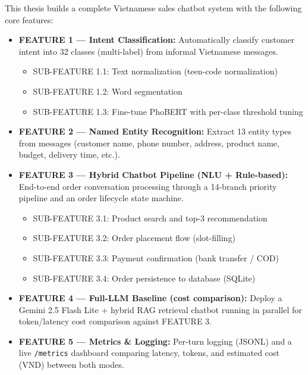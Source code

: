 \documentclass[12pt, a4paper]{report}
\begin{document}
This thesis builds a complete Vietnamese sales chatbot system
with the following core features:

\begin{itemize}
  \item \textbf{FEATURE 1 --- Intent Classification:}
        Automatically classify customer intent into 32 classes (multi-label)
        from informal Vietnamese messages.
        \begin{itemize}
          \item SUB-FEATURE 1.1: Text normalization (teen-code normalization)
          \item SUB-FEATURE 1.2: Word segmentation
          \item SUB-FEATURE 1.3: Fine-tune PhoBERT with per-class threshold tuning
        \end{itemize}

  \item \textbf{FEATURE 2 --- Named Entity Recognition:}
        Extract 13 entity types from messages
        (customer name, phone number, address, product name, budget, delivery time, etc.).

  \item \textbf{FEATURE 3 --- Hybrid Chatbot Pipeline (NLU + Rule-based):}
        End-to-end order conversation processing through a 14-branch priority pipeline
        and an order lifecycle state machine.
        \begin{itemize}
          \item SUB-FEATURE 3.1: Product search and top-3 recommendation
          \item SUB-FEATURE 3.2: Order placement flow (slot-filling)
          \item SUB-FEATURE 3.3: Payment confirmation (bank transfer / COD)
          \item SUB-FEATURE 3.4: Order persistence to database (SQLite)
        \end{itemize}

  \item \textbf{FEATURE 4 --- Full-LLM Baseline (cost comparison):}
        Deploy a Gemini 2.5 Flash Lite + hybrid RAG retrieval chatbot
        running in parallel for token/latency cost comparison against FEATURE 3.

  \item \textbf{FEATURE 5 --- Metrics \& Logging:}
        Per-turn logging (JSONL) and a live \texttt{/metrics} dashboard comparing
        latency, tokens, and estimated cost (VND) between both modes.
\end{itemize}
\end{document}
